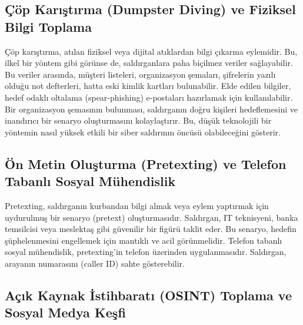 \subsection{Çöp Karıştırma (Dumpster Diving) ve Fiziksel Bilgi Toplama}

Çöp karıştırma, atılan fiziksel veya dijital atıklardan bilgi çıkarma eylemidir. Bu, ilkel bir yöntem gibi görünse de, saldırganlara paha biçilmez veriler sağlayabilir. Bu veriler arasında, müşteri listeleri, organizasyon şemaları, şifrelerin yazılı olduğu not defterleri, hatta eski kimlik kartları bulunabilir. Elde edilen bilgiler, hedef odaklı oltalama (spear-phishing) e-postaları hazırlamak için kullanılabilir. Bir organizasyon şemasının bulunması, saldırganın doğru kişileri hedeflemesini ve inandırıcı bir senaryo oluşturmasını kolaylaştırır. Bu, düşük teknolojili bir yöntemin nasıl yüksek etkili bir siber saldırının öncüsü olabileceğini gösterir.

\subsection{Ön Metin Oluşturma (Pretexting) ve Telefon Tabanlı Sosyal Mühendislik}

Pretexting, saldırganın kurbandan bilgi almak veya eylem yaptırmak için uydurulmuş bir senaryo (pretext) oluşturmasıdır. Saldırgan, IT teknisyeni, banka temsilcisi veya meslektaş gibi güvenilir bir figürü taklit eder. Bu senaryo, hedefin şüphelenmesini engellemek için mantıklı ve acil görünmelidir. Telefon tabanlı sosyal mühendislik, pretexting'in telefon üzerinden uygulanmasıdır. Saldırgan, arayanın numarasını (caller ID) sahte gösterebilir.

\subsection{Açık Kaynak İstihbaratı (OSINT) Toplama ve Sosyal Medya Keşfi}

